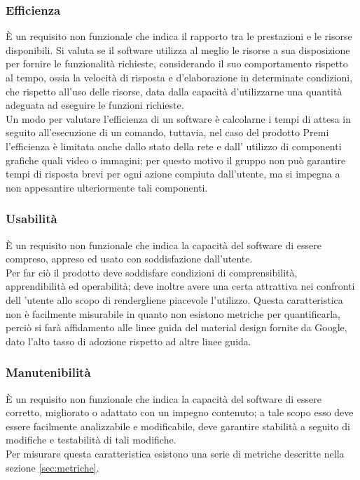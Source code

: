 \subsubsection{Efficienza}
È un requisito non funzionale che indica il rapporto tra le prestazioni e le risorse disponibili.
Si valuta se il software utilizza al meglio le risorse a sua disposizione per fornire le funzionalità richieste, considerando il suo comportamento rispetto al tempo, ossia la velocità di risposta e d'elaborazione in determinate condizioni, che rispetto all’uso delle risorse, data dalla capacità d'utilizzarne una quantità adeguata ad eseguire le funzioni richieste. \\
Un modo per valutare l’efficienza di un software è calcolarne i tempi di attesa in seguito all’esecuzione di un comando, tuttavia, nel caso del prodotto Premi l'efficienza è limitata anche dallo stato della rete e dall' utilizzo di componenti grafiche quali video o immagini; per questo motivo il gruppo non può garantire tempi di risposta brevi per ogni azione compiuta dall’utente, ma si impegna a non appesantire ulteriormente tali componenti.

\subsubsection{Usabilità}
È un requisito non funzionale che indica la capacità del software di essere compreso, appreso ed usato con soddisfazione dall'utente. \\
Per far ciò il prodotto deve soddisfare condizioni di comprensibilità, apprendibilità ed operabilità; deve inoltre avere una certa attrattiva nei confronti dell 'utente allo scopo di rendergliene piacevole l’utilizzo. Questa caratteristica non è facilmente misurabile in quanto non esistono metriche per quantificarla, perciò si farà affidamento alle linee guida del material design fornite da Google, dato l'alto tasso di adozione rispetto ad altre linee guida.

\subsubsection{Manutenibilità}
È un requisito non funzionale che indica la capacità del software di essere corretto, migliorato o adattato con un impegno contenuto; a tale scopo esso deve essere facilmente analizzabile e modificabile, deve garantire stabilità a seguito di modifiche e testabilità di tali modifiche.  \\
Per misurare questa caratteristica esistono una serie di metriche descritte nella sezione \ref{sec:metriche}.

